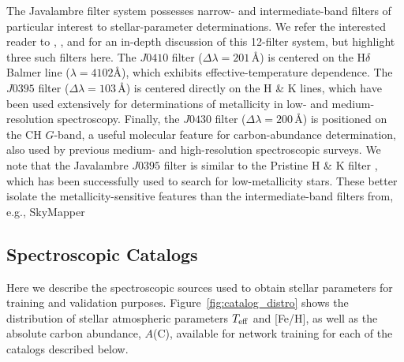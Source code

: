 \documentclass[twocolumn,trackchanges]{aastex63}
\begin{document}
The Javalambre filter system possesses narrow- and intermediate-band filters of particular interest to stellar-parameter determinations. We refer the interested reader to \citet{MarinFranch12}, \citet{Cenarro:2019}, and \citet{Mendes:2019} for an in-depth discussion of this 12-filter system, but highlight three such filters here. The $J0410$ filter ($\Delta \lambda=201$\,\AA) is centered on the H$\delta$ Balmer line ($\lambda = 4102$\AA), which exhibits effective-temperature dependence. The $J0395$ filter ($\Delta \lambda = 103$\,\AA) is centered directly on the  H \& K lines, which have been used extensively for determinations of metallicity in low- and medium-resolution spectroscopy. Finally, the $J0430$ filter ($\Delta \lambda = 200$\,\AA) is positioned on the CH $G$-band, a useful molecular feature for carbon-abundance determination, also used by previous medium- and high-resolution spectroscopic surveys. 
%
We note that the Javalambre $J0395$ filter is similar to the Pristine  H \& K filter \citep{Starkenburg:2017}, which has been successfully used to search for low-metallicity stars. These better isolate the metallicity-sensitive features than the intermediate-band filters from, e.g., SkyMapper \citep[$v$ filter,][]{bessell2011,wolf2018}


\subsection{Spectroscopic Catalogs}

Here we describe the spectroscopic sources used to obtain stellar parameters for training and validation purposes. Figure~\ref{fig:catalog_distro} shows the distribution of stellar atmospheric parameters $T_{\rm eff}$ and [Fe/H], as well as the absolute carbon abundance, $A$(C), available for network training for each of the catalogs described below.
\end{document}
